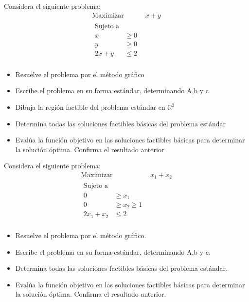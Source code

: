 \documentclass{article}
\begin{document}
Considera el siguiente problema:
\begin{equation*}
  \begin{aligned}
    \text{Maximizar}\quad & x+y\\
    \begin{aligned}
      \text{Sujeto a}& \quad\\
      x & \geq 0\\
      y & \geq 0\\
      2x+y & \leq 2\\
    \end{aligned}
    \end{aligned}
  \end{equation*}
  \begin{itemize}
  \item Resuelve el problema por el método gráfico
  \item Escribe el problema en su forma estándar, determinando A,b y c
  \item Dibuja la región factible del problema estándar en $\mathbb{R}^3$
  \item Determina todas las soluciones factibles básicas del problema estándar
  \item Evalúa la función objetivo en las soluciones factibles básicas para determinar la solución óptima. Confirma el resultado anterior 
  \end{itemize}
  Considera el siguiente problema:
  \begin{equation*}
  \begin{aligned}
    \text{Maximizar}\quad & x_1+x_2\\
    \begin{aligned}
      \text{Sujeto a}& \quad\\
      0 & \geq x_1\\
      0 & \geq x_2\geq 1\\
      2x_1+x_2 & \leq 2\\
    \end{aligned}
    \end{aligned}
  \end{equation*}
  \begin{itemize}
  \item Resuelve  el problema por el método gráfico.
  \item Escribe el problema en su forma estándar, determinando A,b y c.
  \item Determina todas las soluciones factibles básicas del problema estándar.
    \item Evalúa  la función objetivo en las soluciones factibles básicas para determinar la solución óptima. Confirma el resultado anterior.
\end{itemize}
\end{document}
